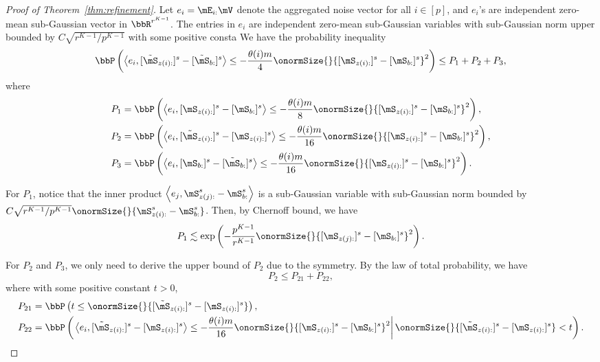 \documentclass[lettersize,onecolumn,journal]{IEEEtran}
\theoremstyle{definition}
\theoremstyle{definition}
\newcommand{\of}[1]{\left(#1\right)}
\newcommand{\ang}[1]{\left\langle#1\right\rangle}
\begin{document}
\begin{proof}[Proof of Theorem~\ref{thm:refinement}]
    Let $e_i = \mE_{i:} \mV$ denote the aggregated noise vector for all $i \in [p]$, and $e_i$'s are independent zero-mean sub-Gaussian vector in $\bbR^{r^{K-1}}$. The entries in $e_i$ are independent zero-mean sub-Gaussian variables with sub-Gaussian norm upper bounded by $C\sqrt{r^{K-1}/p^{K-1}}$ with some positive consta
We have the probability inequality
    \begin{align}
        \bbP \of{ \ang{ e_i, [  \tilde \mS_{z(i):} ]^s - [  \tilde \mS_{b:} ]^s }  \leq - \frac{ \theta(i) m}{4} \onormSize{}{ [ \mS_{z(i):}  ]^s - [ \mS_{b:}  ]^s  }^2} \leq P_1 + P_2 + P_3,
    \end{align}
    where 
    \begin{align}
        P_1 &= \bbP \of{ \ang{e_i, [  \mS_{z(i):} ]^s - [ \mS_{b:} ]^s} \leq -\frac{\theta(i)m}{8}  \onormSize{}{ [ \mS_{z(i):}  ]^s - [ \mS_{b:}  ]^s  }^2 }, \\
        P_2 &= \bbP \of{ \ang{e_i, [ \tilde  \mS_{z(i):} ]^s - [ \mS_{z(i):} ]^s} \leq -\frac{\theta(i)m}{16}  \onormSize{}{ [ \mS_{z(i):}  ]^s - [ \mS_{b:}  ]^s  }^2 },\\
        P_3 &= \bbP \of{ \ang{e_i, [  \mS_{b:} ]^s - [\tilde  \mS_{b:} ]^s} \leq -\frac{\theta(i)m}{16}   \onormSize{}{ [ \mS_{z(i):}  ]^s - [ \mS_{b:}  ]^s  }^2 }.
    \end{align}
    
    For $P_1$, notice that the inner product $\ang{e_j,\mS_{z(j):}^s - \mS_{b:}^s} $ is a sub-Gaussian variable with sub-Gaussian norm bounded by $C \sqrt{ r^{K-1}/ p^{K-1} } \onormSize{}{ \mS_{z(i):}^s -  \mS_{b:}^s }$. Then, by Chernoff bound, we have  
    \begin{equation}\label{eq:p1_2}
         P_1 \lesssim \exp \of{  - \frac{p^{K-1}}{r^{K-1}}   \onormSize{}{ [ \mS_{z(j):}  ]^s - [ \mS_{b:}  ]^s  }^2 }.
    \end{equation}
    
    For $P_2$ and $P_3$, we only need to derive the upper bound of $P_2$ due to the symmetry. By the law of total probability, we have 
    \begin{equation}\label{eq:p2}
        P_2 \leq P_{21} + P_{22},
    \end{equation}
    where with some positive constant $t>0$,
    \begin{align}
        P_{21}& =  \bbP \of{ t \leq   \onormSize{}{ [ \tilde  \mS_{z(i):} ]^s - [ \mS_{z(i):} ]^s }},\\
        P_{22} &= \bbP \of{ \left. \ang{e_i, [ \tilde  \mS_{z(i):} ]^s - [ \mS_{z(i):} ]^s} \leq -\frac{\theta(i)m}{16}  \onormSize{}{ [ \mS_{z(i):}  ]^s - [ \mS_{b:}  ]^s  }^2 \right| \onormSize{}{ [ \tilde  \mS_{z(i):} ]^s - [ \mS_{z(i):} ]^s } < t  }.
    \end{align}
    

\end{proof}
\end{document}
